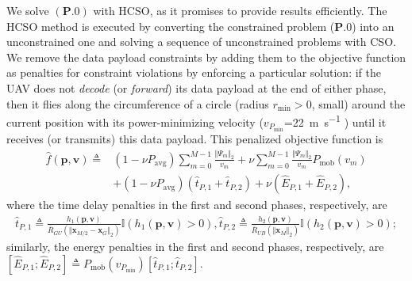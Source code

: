 \documentclass[12pt, draftcls, onecolumn]{IEEEtran}
\theoremstyle{plain}
\theoremstyle{definition}
\theoremstyle{remark}
\begin{document}
We solve $(\mathbf{P.0})$ with HCSO, as it promises to provide results efficiently. The HCSO method is executed by converting the constrained problem ($\mathbf{P.0}$) into an unconstrained one and solving a sequence of unconstrained problems with CSO. We remove the data payload constraints by adding them to the objective function as penalties for constraint violations by enforcing a particular solution: if the UAV does not \emph{decode} (or \emph{forward}) its data payload at the end of either phase, then it flies along the circumference of a circle (radius $r_{\mathrm{min}}{>}0$, small) around the current position with its power-minimizing velocity ($v_{P_{\mathrm{min}}}$=\qty[mode=text]{22}{\meter\per\second} \cite{SCA}) until it receives (or transmits) this data payload. This penalized objective function is
\begin{align}\label{eq:Fhat}
    \hat{f}(\mathbf{p},\mathbf v) \triangleq &(1-\nu P_{\mathrm{avg}}) \sum_{m=0}^{M-1} \frac{\Vert \Psi_m \Vert_2}{v_m} + \nu \sum_{m=0}^{M-1} \frac{\Vert \Psi_m \Vert_2}{v_m} P_{\mathrm{mob}}(v_m) \\
    &+ (1-\nu P_{\mathrm{avg}})(\hat{t}_{P,1} + \hat{t}_{P,2}) + \nu(\hat{E}_{P,1} + \hat{E}_{P,2})\nonumber,
\end{align}
where the time delay penalties in the first and second phases, respectively, are
\begin{align}
    \hat{t}_{P,1} \triangleq \frac{h_{1}(\mathbf p,\mathbf v)}{\bar R_{GU}\left(\Vert\mathbf x_{M/2}-\mathbf x_{G}\Vert_2 \right)} \mathbb{I}\left( h_1 (\mathbf{p},\mathbf v) > 0 \right),
    \hat{t}_{P,2} \triangleq \frac{h_{2}(\mathbf p,\mathbf v)}{\bar R_{UB}\left(\Vert\mathbf x_{M}\Vert_2\right)} \mathbb{I} (h_2 (\mathbf p,\mathbf v) > 0);
\end{align}
similarly, the energy penalties in the first and second phases, respectively, are $[\hat{E}_{P,1};\hat{E}_{P,2}] \triangleq P_{\mathrm{mob}}(v_{P_{\mathrm{min}}})[\hat{t}_{P,1};\hat{t}_{P,2}]$.
\end{document}
